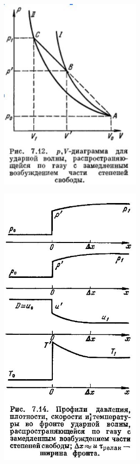 \documentclass[10pt, a4paper]{article}
\begin{document}
\begin{figure}[h!]
	\begin{center}
		\includegraphics[width=70mm]{13. 2 udern adiab.JPG}
	\end{center}
\end{figure}

\begin{figure}[h!]
	\begin{center}
		\includegraphics[width=70mm]{13.rel sloy.JPG}
	\end{center}
\end{figure}
\end{document}
